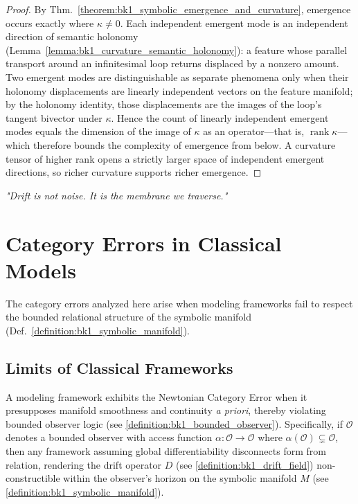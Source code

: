 \begin{proof}
\label{proof:bk1_dimensional_bounds_emergence}
\leavevmode
By Thm.~\ref{theorem:bk1_symbolic_emergence_and_curvature}, emergence occurs exactly where $\kappa \neq 0$. Each independent emergent mode is an independent direction of semantic holonomy (Lemma~\ref{lemma:bk1_curvature_semantic_holonomy}): a feature whose parallel transport around an infinitesimal loop returns displaced by a nonzero amount. Two emergent modes are distinguishable as separate phenomena only when their holonomy displacements are linearly independent vectors on the feature manifold; by the holonomy identity, those displacements are the images of the loop's tangent bivector under $\kappa$. Hence the count of linearly independent emergent modes equals the dimension of the image of $\kappa$ as an operator---that is, $\operatorname{rank}\kappa$---which therefore bounds the complexity of emergence from below. A curvature tensor of higher rank opens a strictly larger space of independent emergent directions, so richer curvature supports richer emergence.
\end{proof}

\begin{flushright}
\textit{"Drift is not noise. It is the membrane we traverse."}
\end{flushright}

\section{Category Errors in Classical Models}
\label{sec:bk1_category_errors_in_classical_models}

The category errors analyzed here arise when modeling frameworks fail to respect the bounded relational structure of the symbolic manifold (Def.~\ref{definition:bk1_symbolic_manifold}).

\subsection{Limits of Classical Frameworks}
\label{subsec:bk1_limits_of_classical_frameworks}

\begin{definition}
\label{definition:bk1_newtonian_category_error}
A modeling framework exhibits the Newtonian Category Error when it presupposes manifold smoothness and continuity \emph{a priori}, thereby violating bounded observer logic (see \ref{definition:bk1_bounded_observer}). Specifically, if $\mathcal{O}$ denotes a bounded observer with access function $\alpha: \mathcal{O} \to \mathcal{O}$ where $\alpha(\mathcal{O}) \subsetneq \mathcal{O}$, then any framework assuming global differentiability disconnects form from relation, rendering the drift operator $D$ (see \ref{definition:bk1_drift_field}) non-constructible within the observer's horizon on the symbolic manifold $M$ (see \ref{definition:bk1_symbolic_manifold}).
\end{definition}

